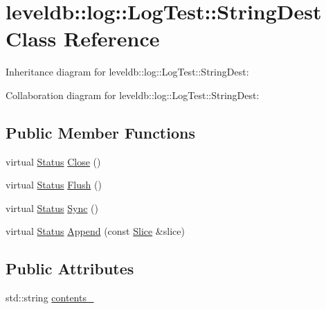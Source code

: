 \hypertarget{classleveldb_1_1log_1_1_log_test_1_1_string_dest}{\section{leveldb\-:\-:log\-:\-:Log\-Test\-:\-:String\-Dest Class Reference}
\label{classleveldb_1_1log_1_1_log_test_1_1_string_dest}
}


Inheritance diagram for leveldb\-:\-:log\-:\-:Log\-Test\-:\-:String\-Dest\-:


Collaboration diagram for leveldb\-:\-:log\-:\-:Log\-Test\-:\-:String\-Dest\-:
\subsection*{Public Member Functions}
\begin{DoxyCompactItemize}
\item 
virtual \hyperlink{classleveldb_1_1_status}{Status} \hyperlink{classleveldb_1_1log_1_1_log_test_1_1_string_dest_a38df1bcf8935024e4f285a58659b2718}{Close} ()
\item 
virtual \hyperlink{classleveldb_1_1_status}{Status} \hyperlink{classleveldb_1_1log_1_1_log_test_1_1_string_dest_a697cde4f8abd492d7a00fc44254af051}{Flush} ()
\item 
virtual \hyperlink{classleveldb_1_1_status}{Status} \hyperlink{classleveldb_1_1log_1_1_log_test_1_1_string_dest_a62d1a49e6d80f723dc28e8dca944b39a}{Sync} ()
\item 
virtual \hyperlink{classleveldb_1_1_status}{Status} \hyperlink{classleveldb_1_1log_1_1_log_test_1_1_string_dest_a9760e8138f167b8b367232998cb53606}{Append} (const \hyperlink{classleveldb_1_1_slice}{Slice} \&slice)
\end{DoxyCompactItemize}
\subsection*{Public Attributes}
\begin{DoxyCompactItemize}
\item 
std\-::string \hyperlink{classleveldb_1_1log_1_1_log_test_1_1_string_dest_a9a56f56d73ff14a617b2737c16e28bf4}{contents\-\_\-}
\end{DoxyCompactItemize}


